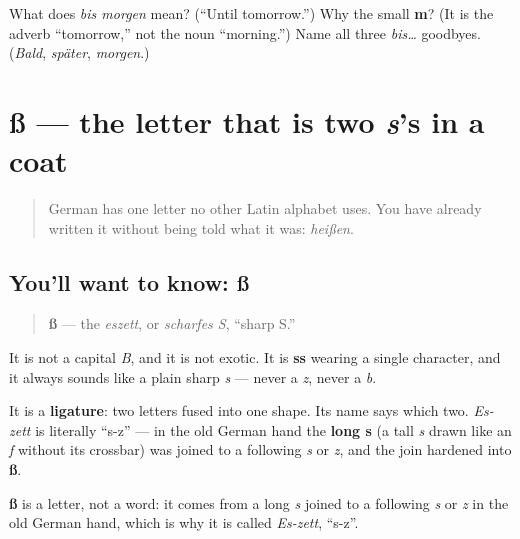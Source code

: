 \begin{tcolorbox}[breakable,colback=teal!4,colframe=teal!35!black,title={Before you move on}]
What does \emph{bis morgen} mean? (\textquotedblleft{}Until tomorrow.\textquotedblright{}) Why the small \textbf{m}? (It is the adverb \textquotedblleft{}tomorrow,\textquotedblright{} not the noun \textquotedblleft{}morning.\textquotedblright{}) Name all three \emph{bis…} goodbyes. (\emph{Bald}, \emph{später}, \emph{morgen}.)
\end{tcolorbox}
\section[ß]{ß — the letter that is two \emph{s}'s in a coat}

\label{lesson:GE-W01-eszett}



\begin{quote}
German has one letter no other Latin alphabet uses. You have already written it without being told what it was: \emph{heißen}.
\end{quote}

\subsection*{You'll want to know: ß}
\begin{quote}
\textbf{ß} — the \emph{eszett}, or \emph{scharfes S}, \textquotedblleft{}sharp S.\textquotedblright{}
\end{quote}

It is not a capital \emph{B}, and it is not exotic. It is \textbf{ss} wearing a single character, and it always sounds like a plain sharp \emph{s} — never a \emph{z}, never a \emph{b}.

It is a \textbf{ligature}: two letters fused into one shape. Its name says which two. \emph{Es-zett} is literally \textquotedblleft{}s-z\textquotedblright{} — in the old German hand the \textbf{long s} (a tall \emph{s} drawn like an \emph{f} without its crossbar) was joined to a following \emph{s} or \emph{z}, and the join hardened into \textbf{ß}.

\begin{cousinweb}
\textbf{ß} is a letter, not a word: it comes from a long \emph{s} joined to a following \emph{s} or \emph{z} in the old German hand, which is why it is called \emph{Es-zett}, \textquotedblleft{}s-z\textquotedblright{}.
\end{cousinweb}

